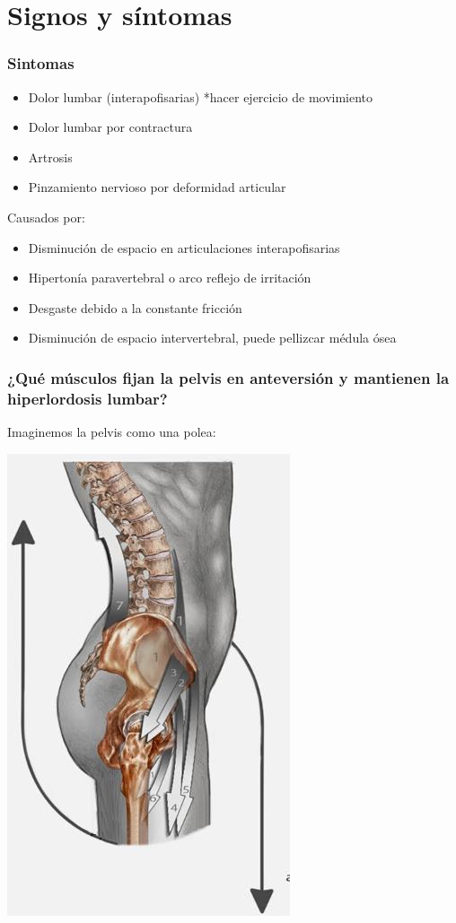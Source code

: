 \documentclass[hyperref={pdfpagelabels=false},xcolor=pst,pdf,fragile]{beamer}
\begin{document}
\section{Signos y síntomas}
\begin{frame}
\frametitle{Sintomas}
  \begin{itemize}
	\item Dolor lumbar (interapofisarias) *hacer ejercicio de movimiento
	\item Dolor lumbar por contractura
	\item Artrosis
	\item Pinzamiento nervioso por deformidad articular
  \end{itemize}

  \pause

  Causados por:
  \begin{itemize}
	\item Disminución de espacio en articulaciones interapofisarias
	\item Hipertonía paravertebral o arco reflejo de irritación
	\item Desgaste debido a la constante fricción
	\item Disminución de espacio intervertebral, puede pellizcar médula ósea
  \end{itemize}

\end{frame}

\begin{frame}
  \frametitle{¿Qué músculos fijan la pelvis en anteversión y mantienen la hiperlordosis lumbar?}

  Imaginemos la pelvis como una polea:
    \begin{center}
	  \includegraphics[scale=0.4]{img/pelvis_polea.jpg}
  \end{center}
\end{frame}
\end{document}

